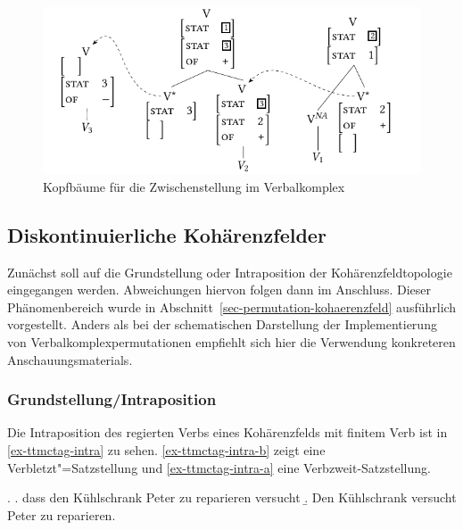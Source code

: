\begin{figure}[t]
\centering
\includegraphics{graphics/abb712.pdf}
\caption{\label{fig-ttmctag-zwisch}Kopfbäume für die Zwischenstellung im Verbalkomplex}
\end{figure}




\subsection{Diskontinuierliche Kohärenzfelder}\label{sec-ttmctag-permutation}

Zunächst soll auf die Grundstellung oder Intraposition der Kohärenzfeldtopologie eingegangen werden. Abweichungen hiervon folgen dann im Anschluss. Dieser Phänomenbereich wurde in Abschnitt~\ref{sec-permutation-kohaerenzfeld} ausführlich vorgestellt. Anders als bei der schematischen Darstellung der Implementierung von Verbalkomplexpermutationen empfiehlt sich hier die Verwendung konkreteren Anschauungsmaterials.

\subsubsection*{Grundstellung/Intraposition}

Die Intraposition des regierten Verbs eines Kohärenzfelds mit finitem Verb ist in \ref{ex-ttmctag-intra} zu sehen. \ref{ex-ttmctag-intra-b} zeigt eine Verbletzt"=Satzstellung und \ref{ex-ttmctag-intra-a} eine Verbzweit-Satzstellung.

\ex. \label{ex-ttmctag-intra}
\a. dass den Kühlschrank Peter zu reparieren versucht \label{ex-ttmctag-intra-b}
\b. Den Kühlschrank versucht Peter zu reparieren. \label{ex-ttmctag-intra-a}

